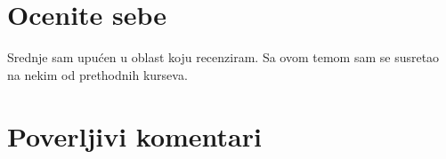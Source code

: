 \documentclass[a4paper]{article}
\begin{document}
\section{Ocenite sebe}
Srednje sam upućen u oblast koju recenziram. Sa ovom temom sam se susretao na nekim od prethodnih kurseva.


\section{Poverljivi komentari}
\end{document}
